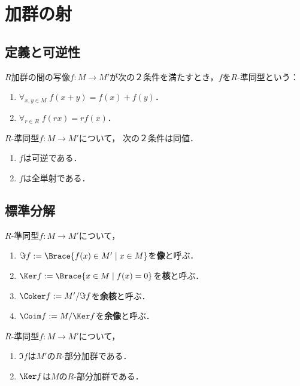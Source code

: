 \documentclass[uplatex,dvipdfmx]{jsreport}
\begin{document}
\section{加群の射}

\subsection{定義と可逆性}

\begin{definition}
    $R$加群の間の写像$f:M\to M'$が次の２条件を満たすとき，$f$を$R$-準同型という：
    \begin{enumerate}
        \item $\forall_{x,y\in M}\;f(x+y)=f(x)+f(y)$．
        \item $\forall_{r\in R}\;f(rx)=rf(x)$．
    \end{enumerate}
\end{definition}

\begin{lemma}\label{lemma-inversibility-and-bijection}
    $R$-準同型$f:M\to M'$について，
    次の２条件は同値．
    \begin{enumerate}
        \item $f$は可逆である．
        \item $f$は全単射である．
    \end{enumerate}
\end{lemma}

\subsection{標準分解}

\begin{definition}
    $R$-準同型$f:M\to M'$について，
    \begin{enumerate}
        \item $\Im f:=\Brace{f(x)\in M'\mid x\in M}$を\textbf{像}と呼ぶ．
        \item $\Ker f:=\Brace{x\in M\mid f(x)=0}$を\textbf{核}と呼ぶ．
        \item $\Coker f:=M'/\Im f$を\textbf{余核}と呼ぶ．
        \item $\Coim f:=M/\Ker f$を\textbf{余像}と呼ぶ．
    \end{enumerate}
\end{definition}

\begin{lemma}
    $R$-準同型$f:M\to M'$について，
    \begin{enumerate}
        \item $\Im f$は$M'$の$R$-部分加群である．
        \item $\Ker f$は$M$の$R$-部分加群である．
    \end{enumerate}
\end{lemma}
\end{document}
